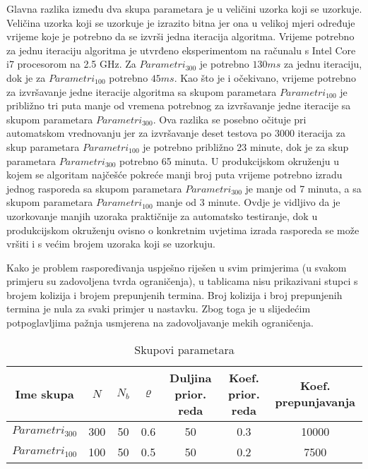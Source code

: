 \documentclass[times, utf8, zavrsni]{fer}
\begin{document}
Glavna razlika
između dva skupa parametara je u veličini uzorka koji se uzorkuje. Veličina uzorka koji se uzorkuje je izrazito bitna jer ona u velikoj mjeri određuje vrijeme koje je potrebno
da se izvrši jedna iteracija algoritma. Vrijeme potrebno za jednu iteraciju algoritma je utvrđeno eksperimentom na računalu s Intel Core i7 procesorom na 2.5 GHz. Za
$Parametri_{300}$ je potrebno $130 ms$ za jednu iteraciju, dok je za $Parametri_{100}$ potrebno $45 ms$. Kao što je i očekivano, vrijeme potrebno za izvršavanje jedne iteracije
algoritma sa skupom parametara $Parametri_{100}$ je približno tri puta manje od vremena potrebnog za izvršavanje jedne iteracije sa skupom parametara $Parametri_{300}$. Ova
razlika se posebno očituje pri automatskom vrednovanju jer za izvršavanje deset testova po $3000$ iteracija za skup parametara $Parametri_{100}$ je potrebno
približno 23 minute, dok je za skup parametara $Parametri_{300}$ potrebno 65 minuta. U produkcijskom okruženju u kojem se algoritam najčešće pokreće manji broj puta
vrijeme potrebno izradu jednog rasporeda sa skupom parametara $Parametri_{300}$ je manje od 7 minuta, a sa skupom parametara $Parametri_{100}$ manje od 3 minute.
Ovdje je vidljivo da je uzorkovanje manjih uzoraka praktičnije za automatsko testiranje, dok u produkcijskom okruženju ovisno o konkretnim uvjetima izrada rasporeda se
može vršiti i s većim brojem uzoraka koji se uzorkuju.


Kako je problem raspoređivanja uspješno riješen u svim primjerima (u svakom primjeru su zadovoljena tvrda ograničenja), u tablicama nisu prikazivani stupci s brojem kolizija
i brojem prepunjenih termina. Broj kolizija i broj prepunjenih termina je nula za svaki primjer u nastavku. Zbog toga je u slijedećim potpoglavljima pažnja usmjerena na
zadovoljavanje mekih ograničenja.


\begin{table}
  \caption{Skupovi parametara}
  \label{tbl:parametri}
  \centering
  \begin{tabular}{c | c | c | c | c | c | c  }
    Ime skupa     &  $N$ & $N_b$ & $\varrho$ & Duljina prior. reda & Koef. prior. reda & Koef. prepunjavanja \\ \hline
    $Parametri_{300}$ & 300 & 50 & 0.6 & 50 & 0.3 & 10000  \\ \hline
    $Parametri_{100}$ & 100 & 50 & 0.5 & 50 & 0.2 & 7500
  \end{tabular}
\end{table}
\end{document}
